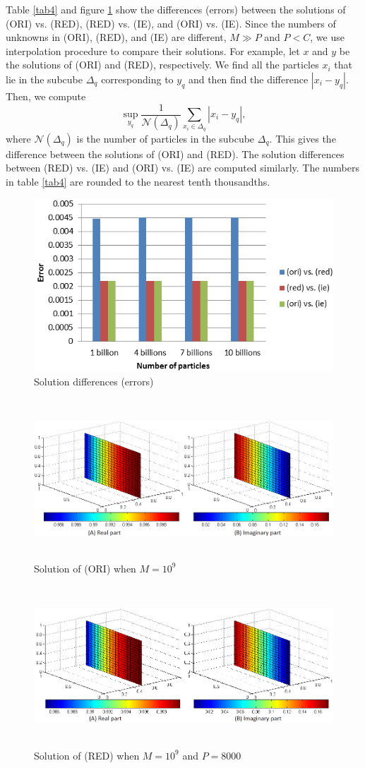 \documentclass{wap}
\newcommand{\be}{\begin{equation}}
\newcommand{\ee}{\end{equation}}
\begin{document}
Table \ref{tab4} and figure \ref{fig2} show the differences (errors) between the solutions of (ORI) vs. (RED), (RED) vs. (IE), and (ORI) vs. (IE). Since the numbers of unknowns in (ORI), (RED), and (IE) are different, $M \gg P$ and $P < C$, we use interpolation procedure to compare their solutions. For example, let $x$ and $y$ be the solutions of (ORI) and (RED), respectively. We find all the particles $x_i$ that lie in the subcube $\Delta_q$ corresponding to $y_q$ and then find the difference $|x_i-y_q|$. Then, we compute
\be
	\sup_{y_q} \frac{1}{\mathcal{N}(\Delta_q)}\sum_{x_i \in \Delta_q}|x_i-y_q|,
\ee
where $\mathcal{N}(\Delta_q)$ is the number of particles in the subcube $\Delta_q$. This gives the difference between the solutions of (ORI) and (RED). The solution differences between (RED) vs. (IE) and (ORI) vs. (IE) are computed similarly. The numbers in table \ref{tab4} are rounded to the nearest tenth thousandths.
\begin{figure}[htbp]
\centering
\includegraphics[width=0.5\linewidth]{SolutionCompare}
\caption{Solution differences (errors)}
\label{fig2}
\end{figure}

\begin{figure}[htbp]
	\centering
	\includegraphics[width=.7\linewidth,height=6cm]{1b_ori}
	\caption{Solution of (ORI) when $M=10^9$}
	\label{fig3}
\end{figure}

\begin{figure}[htbp]
	\centering
	\includegraphics[width=.7\linewidth,height=6cm]{1b_red}
	\caption{Solution of (RED) when $M=10^9$ and $P=8000$}
	\label{fig4}
\end{figure}
\end{document}
